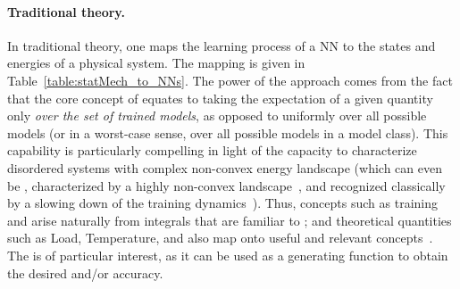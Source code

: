 \paragraph{Traditional \SMOG theory.}
In traditional \SMOG theory, one maps the learning process of a NN to the states and energies of a physical system.
The mapping is given in Table~\ref{table:statMech_to_NNs}.
The power of the \STATMECH approach comes from the fact that the core concept of \ThermalAverages equates to taking 
the expectation of a given quantity only \emph{over the set of trained models}, as opposed to 
uniformly over all possible models (or in a worst-case sense, over all possible models in a model class).
This capability is particularly compelling in light of the \STATMECH capacity to characterize disordered 
systems with complex non-convex energy landscape (which can even be \emph{\Glassy}, characterized by a
highly non-convex landscape~\cite{SST92, STS90, engel2001statistical},
and recognized classically by a slowing down of the training dynamics~\cite{gutfreund1985spin}).
Thus, concepts such as training and \GeneralizationError arise naturally from integrals that are familiar to \STATMECH; 
and theoretical quantities such as Load, Temperature, and \FreeEnergy also map onto useful and relevant concepts~\cite{MM17_TR}. 
The \FreeEnergy is of particular interest, as it can be used as a generating function to obtain the desired \GeneralizationError and/or accuracy.


